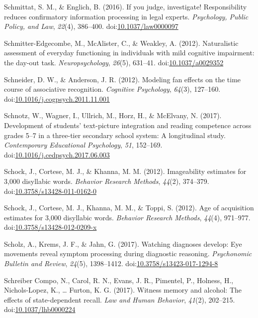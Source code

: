 \documentclass[english,man]{apa6}
\begin{document}
\hypertarget{ref-Schmittat2016}{}
Schmittat, S. M., \& Englich, B. (2016). If you judge, investigate!
Responsibility reduces confirmatory information processing in legal
experts. \emph{Psychology, Public Policy, and Law}, \emph{22}(4),
386--400.
doi:\href{https://doi.org/10.1037/law0000097}{10.1037/law0000097}

\hypertarget{ref-Schmitter-Edgecombe2012}{}
Schmitter-Edgecombe, M., McAlister, C., \& Weakley, A. (2012).
Naturalistic assessment of everyday functioning in individuals with mild
cognitive impairment: the day-out task. \emph{Neuropsychology},
\emph{26}(5), 631--41.
doi:\href{https://doi.org/10.1037/a0029352}{10.1037/a0029352}

\hypertarget{ref-Schneider2012}{}
Schneider, D. W., \& Anderson, J. R. (2012). Modeling fan effects on the
time course of associative recognition. \emph{Cognitive Psychology},
\emph{64}(3), 127--160.
doi:\href{https://doi.org/10.1016/j.cogpsych.2011.11.001}{10.1016/j.cogpsych.2011.11.001}

\hypertarget{ref-Schnotz2017}{}
Schnotz, W., Wagner, I., Ullrich, M., Horz, H., \& McElvany, N. (2017).
Development of students' text-picture integration and reading competence
across grades 5--7 in a three-tier secondary school system: A
longitudinal study. \emph{Contemporary Educational Psychology},
\emph{51}, 152--169.
doi:\href{https://doi.org/10.1016/j.cedpsych.2017.06.003}{10.1016/j.cedpsych.2017.06.003}

\hypertarget{ref-Schock2012}{}
Schock, J., Cortese, M. J., \& Khanna, M. M. (2012). Imageability
estimates for 3,000 disyllabic words. \emph{Behavior Research Methods},
\emph{44}(2), 374--379.
doi:\href{https://doi.org/10.3758/s13428-011-0162-0}{10.3758/s13428-011-0162-0}

\hypertarget{ref-Schock2012a}{}
Schock, J., Cortese, M. J., Khanna, M. M., \& Toppi, S. (2012). Age of
acquisition estimates for 3,000 disyllabic words. \emph{Behavior
Research Methods}, \emph{44}(4), 971--977.
doi:\href{https://doi.org/10.3758/s13428-012-0209-x}{10.3758/s13428-012-0209-x}

\hypertarget{ref-Scholz2017}{}
Scholz, A., Krems, J. F., \& Jahn, G. (2017). Watching diagnoses
develop: Eye movements reveal symptom processing during diagnostic
reasoning. \emph{Psychonomic Bulletin and Review}, \emph{24}(5),
1398--1412.
doi:\href{https://doi.org/10.3758/s13423-017-1294-8}{10.3758/s13423-017-1294-8}

\hypertarget{ref-SchreiberCompo2017}{}
Schreiber Compo, N., Carol, R. N., Evans, J. R., Pimentel, P., Holness,
H., Nichols-Lopez, K., \ldots{} Furton, K. G. (2017). Witness memory and
alcohol: The effects of state-dependent recall. \emph{Law and Human
Behavior}, \emph{41}(2), 202--215.
doi:\href{https://doi.org/10.1037/lhb0000224}{10.1037/lhb0000224}
\end{document}
